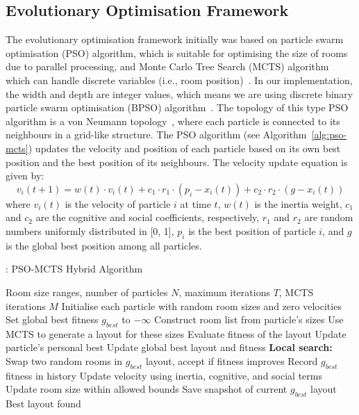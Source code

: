 \documentclass[]{article}
\begin{document}
\subsection{Evolutionary Optimisation Framework}
The evolutionary optimisation framework initially was based on particle swarm optimisation (PSO) algorithm, which is suitable for optimising the size of rooms due to parallel processing, and Monte Carlo Tree Search (MCTS) algorithm which can handle discrete variables (i.e., room position)~\cite{YAN2024110546}. In our implementation, the width and depth are integer values, which means we are using discrete binary particle swarm optimisation (BPSO) algorithm~\cite{YAN2024110546, KennedyJ.1997Adbv}. The topology of this type PSO algorithm is a von Neumann topology~\cite{HousseinEssamH.2021MAiP}, where each particle is connected to its neighbours in a grid-like structure. The PSO algorithm (see Algorithm~\ref{alg:pso-mcts}) updates the velocity and position of each particle based on its own best position and the best position of its neighbours. The velocity update equation is given by:
\begin{equation*}
    v_i(t+1) = w(t) \cdot v_i(t) + c_1 \cdot r_1 \cdot (p_i - x_i(t)) + c_2 \cdot r_2 \cdot (g - x_i(t))
\end{equation*}
where $v_i(t)$ is the velocity of particle $i$ at time $t$, $w(t)$ is the inertia weight, $c_1$ and $c_2$ are the cognitive and social coefficients, respectively, $r_1$ and $r_2$ are random numbers uniformly distributed in [0, 1], $p_i$ is the best position of particle $i$, and $g$ is the global best position among all particles.

\begin{algorithm}[H]
    \caption{: PSO-MCTS Hybrid Algorithm}
    \label{alg:pso-mcts}
    \begin{algorithmic}[1]
        \REQUIRE Room size ranges, number of particles $N$, maximum iterations $T$, MCTS iterations $M$
        \STATE Initialise each particle with random room sizes and zero velocities
        \STATE Set global best fitness $g_{best}$ to $-\infty$
        \STATE Construct room list from particle's sizes
        \STATE Use MCTS to generate a layout for these sizes
        \STATE Evaluate fitness of the layout
        \STATE Update particle's personal best
        \ENDIF
        \STATE Update global best layout and fitness
        \ENDIF
        \ENDFOR
        \STATE \textbf{Local search:} Swap two random rooms in $g_{best}$ layout, accept if fitness improves
        \STATE Record $g_{best}$ fitness in history
        \STATE Update velocity using inertia, cognitive, and social terms
        \STATE Update room size within allowed bounds
        \ENDFOR
        \ENDFOR
        \STATE Save snapshot of current $g_{best}$ layout
        \ENDIF
        \ENDFOR
        \RETURN Best layout found
    \end{algorithmic}
\end{algorithm}
\end{document}
